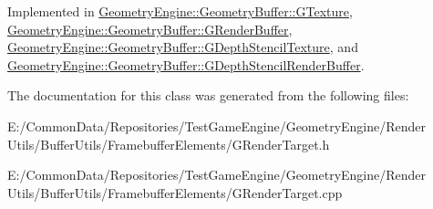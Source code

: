 Implemented in \mbox{\hyperlink{class_geometry_engine_1_1_geometry_buffer_1_1_g_texture_a30c0e98fd265c6f47fe7df0ad4f39644}{Geometry\+Engine\+::\+Geometry\+Buffer\+::\+G\+Texture}}, \mbox{\hyperlink{class_geometry_engine_1_1_geometry_buffer_1_1_g_render_buffer_adb0c62f7d9fb1d61b3ea84bc026fa539}{Geometry\+Engine\+::\+Geometry\+Buffer\+::\+G\+Render\+Buffer}}, \mbox{\hyperlink{class_geometry_engine_1_1_geometry_buffer_1_1_g_depth_stencil_texture_aa4b676746b13f4ea748450ea19ca711a}{Geometry\+Engine\+::\+Geometry\+Buffer\+::\+G\+Depth\+Stencil\+Texture}}, and \mbox{\hyperlink{class_geometry_engine_1_1_geometry_buffer_1_1_g_depth_stencil_render_buffer_af2877932c33e892f310de1c07ad69a20}{Geometry\+Engine\+::\+Geometry\+Buffer\+::\+G\+Depth\+Stencil\+Render\+Buffer}}.



The documentation for this class was generated from the following files\+:\begin{DoxyCompactItemize}
\item 
E\+:/\+Common\+Data/\+Repositories/\+Test\+Game\+Engine/\+Geometry\+Engine/\+Render Utils/\+Buffer\+Utils/\+Framebuffer\+Elements/G\+Render\+Target.\+h\item 
E\+:/\+Common\+Data/\+Repositories/\+Test\+Game\+Engine/\+Geometry\+Engine/\+Render Utils/\+Buffer\+Utils/\+Framebuffer\+Elements/G\+Render\+Target.\+cpp\end{DoxyCompactItemize}
